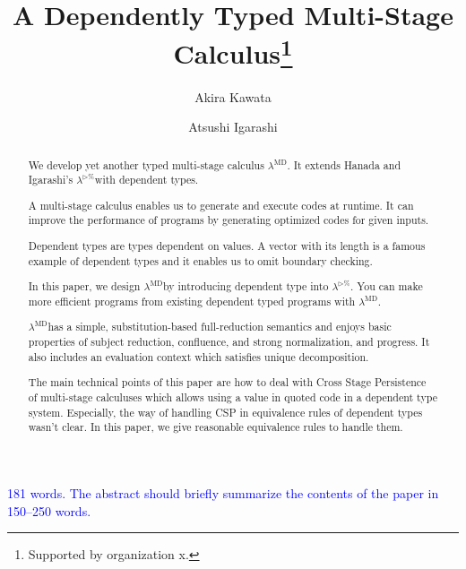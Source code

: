 \documentclass[runningheads]{llncs}
\newcommand{\blue}[1]{\textcolor{blue}{#1 }}
\newcommand{\LTP}{$\lambda^{\triangleright\%}$}
\newcommand{\LMD}{$\lambda^{\textrm{MD}}$}
\newcommand{\TW}{\triangleright}
\begin{document}
%
\title{A Dependently Typed Multi-Stage Calculus\thanks{Supported by organization x.}}
%
%
\author{Akira Kawata \and
Atsushi Igarashi}
%
%
%
\maketitle              %
%
\begin{abstract}

We develop yet another typed multi-stage calculus \LMD.
It extends Hanada and Igarashi's \LTP with dependent types.

A multi-stage calculus enables us to generate and execute codes at runtime.
It can improve the performance of programs by generating optimized codes for given inputs.

Dependent types are types dependent on values. 
A vector with its length is a famous example of dependent types and it enables us to omit boundary checking.

In this paper, we design \LMD by introducing dependent type into $\lambda^{\TW\%}$.
You can make more efficient programs from existing dependent typed programs with \LMD.

\LMD has a simple, substitution-based full-reduction semantics and enjoys basic properties of subject reduction, confluence, and strong normalization, and progress.
It also includes an evaluation context which satisfies unique decomposition.

The main technical points of this paper are how to deal with Cross Stage Persistence of multi-stage calculuses which allows using a value in quoted code in a dependent type system.
Especially, the way of handling CSP in equivalence rules of dependent types wasn't clear.
In this paper, we give reasonable equivalence rules to handle them.

\end{abstract}

\blue{181 words. The abstract should briefly summarize the contents of the paper in 150--250 words.}
%
%
%
\end{document}
